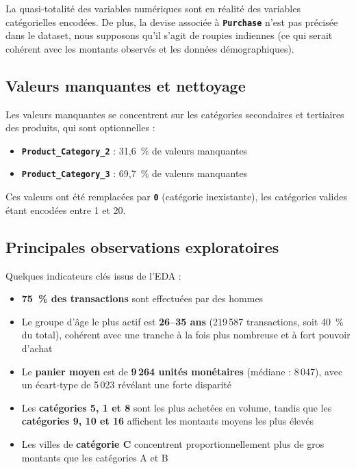 \documentclass[12pt, a4paper]{article}
\newcommand{\mytexttt}[1]{\texttt{\textbf{\textcolor{colortt}{#1}}}}
\begin{document}
\begin{observation}
La quasi-totalité des variables numériques sont en réalité des variables catégorielles encodées. De plus, la devise associée à \mytexttt{Purchase} n'est pas précisée dans le dataset, nous supposons qu'il s'agit de roupies indiennes (ce qui serait cohérent avec les montants observés et les données démographiques).
\end{observation}

\subsection{Valeurs manquantes et nettoyage}

Les valeurs manquantes se concentrent sur les catégories secondaires et tertiaires des produits, qui sont optionnelles :

\begin{itemize}
  \item \mytexttt{Product\_Category\_2} : 31,6~\% de valeurs manquantes
  \item \mytexttt{Product\_Category\_3} : 69,7~\% de valeurs manquantes
\end{itemize}

Ces valeurs ont été remplacées par \mytexttt{0} (catégorie inexistante), les catégories valides étant encodées entre 1 et 20.

\subsection{Principales observations exploratoires}

Quelques indicateurs clés issus de l'EDA :

\begin{itemize}
  \item \textbf{75~\% des transactions} sont effectuées par des hommes
  \item Le groupe d'âge le plus actif est \textbf{26--35 ans} (219\,587 transactions, soit 40~\% du total), cohérent avec une tranche à la fois plus nombreuse et à fort pouvoir d'achat
  \item Le \textbf{panier moyen} est de \textbf{9\,264 unités monétaires} (médiane : 8\,047), avec un écart-type de 5\,023 révélant une forte disparité
  \item Les \textbf{catégories 5, 1 et 8} sont les plus achetées en volume, tandis que les \textbf{catégories 9, 10 et 16} affichent les montants moyens les plus élevés
  \item Les villes de \textbf{catégorie C} concentrent proportionnellement plus de gros montants que les catégories A et B
\end{itemize}
\end{document}
